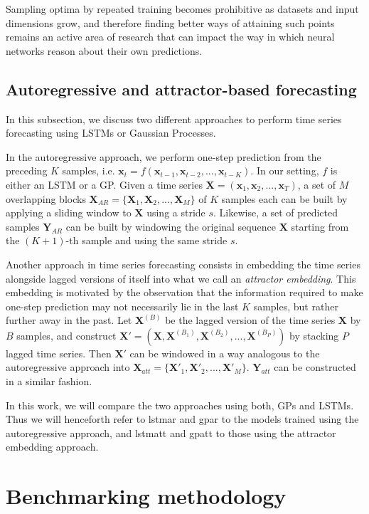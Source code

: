 \documentclass[pdftex,10pt,a4paper,journal]{article}
\theoremstyle{definition}
\theoremstyle{remark}
\newcommand*{\V}[1]{\mathbf{#1}}%
\begin{document}
\begin{multicols}{2}
\par Sampling optima by repeated training becomes prohibitive as datasets and input dimensions grow, and therefore finding better ways of attaining such points remains an active area of research that can impact the way in which neural networks reason about their own predictions.

\subsection{Autoregressive and attractor-based forecasting}
In this subsection, we discuss two different approaches to perform time series forecasting using LSTMs or Gaussian Processes. 
\par In the autoregressive approach, we perform one-step prediction from the preceding $K$ samples, i.e. $\V{x}_t = f(\V{x}_{t-1}, \V{x}_{t-2}, ..., \V{x}_{t-K})$. In our setting, $f$ is either an LSTM or a GP. Given a time series $\V{X} = (\V{x}_{1}, \V{x}_{2}, ..., \V{x}_{T})$, a set of $M$ overlapping blocks $\V{X}_{AR} = \{\V{X}_1, \V{X}_2, ..., \V{X}_M\}$ of $K$ samples each can be built by applying a sliding window to $\V{X}$ using a stride $s$.  Likewise, a set of predicted samples $\V{Y}_{AR}$ can be built by windowing the original sequence $\V{X}$ starting from the $(K+1)$-th sample and using the same stride $s$.
\par Another approach in time series forecasting consists in embedding the time series alongside lagged versions of itself into what we call an \textit{attractor embedding}. This embedding is motivated by the observation that the information required to make one-step prediction may not necessarily lie in the last $K$ samples, but rather further away in the past. Let $\V{X}^{(B)}$ be the lagged version of the time series $\V{X}$ by $B$ samples, and construct $\V{X}' = (\V{X}, \V{X}^{(B_1)}, \V{X}^{(B_2)}, ..., \V{X}^{(B_P)})$ by stacking $P$ lagged time series. Then $\V{X}'$ can be windowed in a way analogous to the autoregressive approach into $\V{X}_{att} = \{\V{X}'_1, \V{X}'_2, ..., \V{X}'_M\}$. $\V{Y}_{att}$ can be constructed in a similar fashion.
\par In this work, we will compare the two approaches using both, GPs and LSTMs. Thus we will henceforth refer to \acrshort*{lstmar} and \acrshort*{gpar} to the models trained using the autoregressive approach, and \acrshort*{lstmatt} and \acrshort*{gpatt} to those using the attractor embedding approach.

\section{Benchmarking methodology}\label{sec_metho}


\end{multicols}
\end{document}
